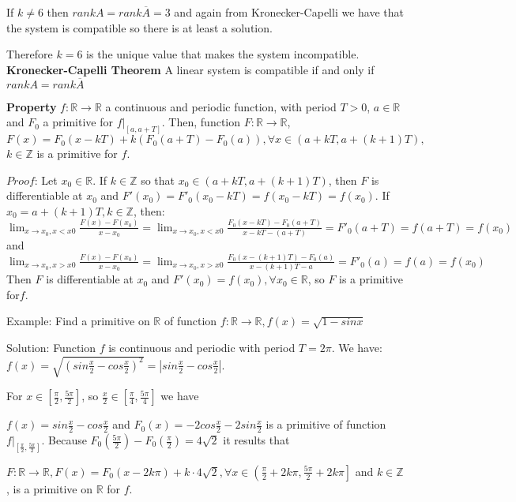 \documentclass{article}
\begin{document}
{If $k\neq6$ then $rankA=rank\overline{A}=3$ and again from Kronecker-Capelli we have that the system is compatible so there is at least a solution.

Therefore $k=6$ is the unique value that makes the system incompatible.
\newline \newline
\textbf{Kronecker-Capelli Theorem} \newline
A linear system is compatible if and only if $rankA=rank\overline{A}$

\newpage

\textbf{Property}
$f:\mathbb{R}\to\mathbb{R}$ a continuous and periodic function, with period $T>0$, $a\in\mathbb{R}$ and $F_0$ a primitive for $\left.f\right|_{[a,a+T]}$. Then, function $F:\mathbb{R}\to\mathbb{R}$, $F(x)=F_0(x-kT)+k(F_0(a+T)-F_0(a)), \forall x\in(a+kT,a+(k+1)T),$
$k\in\mathbb{Z}$ is a primitive for $f$.

$Proof$: Let $x_0\in\mathbb{R}$. If $k\in\mathbb{Z}$ so that $x_0\in(a+kT,a+(k+1)T)$, then $F$ is differentiable at $x_0$ and $F'(x_0)=F'_0(x_0-kT)=f(x_0-kT)=f(x_0)$.
If $x_0=a+(k+1)T, k\in\mathbb{Z}$, then:
$\lim_{x\to x_0, x<x0}\frac{F(x)-F(x_0)}{x-x_0}=\lim_{x\to x_0, x<x0}\frac{F_0(x-kT)-F_0(a+T)}{x-kT-(a+T)}=F'_0(a+T)=f(a+T)=f(x_0)$ 
and
$\lim_{x\to x_0, x>x0}\frac{F(x)-F(x_0)}{x-x_0}=\lim_{x\to x_0, x>x0}\frac{F_0(x-(k+1)T)-F_0(a)}{x-(k+1)T-a}=F'_0(a)=f(a)=f(x_0)$ 
Then $F$ is differentiable at $x_0$ and $F'(x_0)=f(x_0), \forall x_0\in\mathbb{R}$, so $F$ is a primitive for$f$.

Example:
Find a primitive on $\mathbb{R}$ of function $f:\mathbb{R}\to\mathbb{R}, f(x)=\sqrt{1-sin x}$

Solution:
Function $f$ is continuous and periodic with period $T=2\pi$. We have:
$f(x)=\sqrt{\left(sin\frac{x}{2}-cos\frac{x}{2}\right)^2}=\left|sin\frac{x}{2}-cos\frac{x}{2}\right|$.

For $x\in\left[\frac{\pi}{2},\frac{5\pi}{2}\right]$, so $\frac{x}{2}\in\left[\frac{\pi}{4},\frac{5\pi}{4}\right]$ we have

$f(x)=sin\frac{x}{2}-cos\frac{x}{2}$ and $F_0(x)=-2cos\frac{x}{2}-2sin\frac{x}{2}$ is a primitive of function $\left.f\right|_{[\frac{\pi}{2},\frac{5\pi}{2}]}$.
Because $F_0\left(\frac{5\pi}{2}\right)-F_0\left(\frac{\pi}{2}\right)=4\sqrt{2}$ it results that 

$F:\mathbb{R}\to\mathbb{R}, F(x)=F_0(x-2k\pi)+k\cdot4\sqrt{2}, \forall x\in\left(\frac{\pi}{2}+2k\pi, \frac{5\pi}{2}+2k\pi\right]$ and $k\in\mathbb{Z}$, is a primitive on $\mathbb{R}$ for $f$.
 \newpage
 
}
\end{document}
